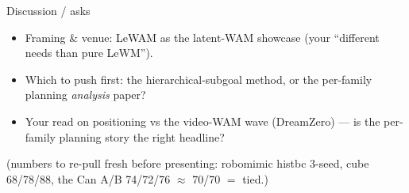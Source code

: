\documentclass[aspectratio=169,9pt]{beamer}
\begin{document}
\begin{frame}{Discussion / asks}
\begin{itemize}
  \item Framing \& venue: LeWAM as the latent-WAM showcase (your ``different needs than pure LeWM'').
  \item Which to push first: the hierarchical-subgoal method, or the per-family planning \emph{analysis} paper?
  \item Your read on positioning vs the video-WAM wave (DreamZero) --- is the per-family planning story the right headline?
\end{itemize}
\vspace{0.8em}
\centering \footnotesize (numbers to re-pull fresh before presenting: robomimic histbc 3-seed, cube 68/78/88, the Can A/B 74/72/76 $\approx$ 70/70 $=$ tied.)
\end{frame}
\end{document}
